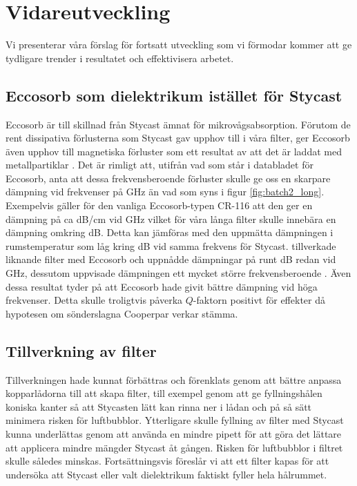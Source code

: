 \documentclass[main.tex]{subfiles}
\begin{document}

\section{Vidareutveckling}
Vi presenterar våra förslag för fortsatt utveckling som vi förmodar kommer att ge tydligare trender i resultatet och effektivisera arbetet.

\subsection{Eccosorb som dielektrikum istället för Stycast}
Eccosorb är till skillnad från Stycast ämnat för mikrovågsabsorption. Förutom de rent dissipativa förlusterna som Stycast gav upphov till i våra filter, ger Eccosorb även upphov till magnetiska förluster som ett resultat av att det är laddat med metallpartiklar \cite{Eccosorb}. Det är rimligt att, utifrån vad som står i databladet för Eccosorb, anta att dessa frekvensberoende förluster skulle ge oss en skarpare dämpning vid frekvenser på \unit[8-50]{GHz} än vad som syns i figur \ref{fig:batch2_long}. Exempelvis gäller för den vanliga Eccosorb-typen CR-116 att den ger en dämpning på ca \unit[57]{dB/cm} vid \unit[18]{GHz} \cite{Eccosorb} vilket för våra långa filter skulle innebära en dämpning omkring \unit[150]{dB}. Detta kan jämföras med den uppmätta dämpningen i rumstemperatur som låg kring \unit[10]{dB} vid samma frekvens för Stycast. \citeauthor{santavicca2008} tillverkade liknande filter med Eccosorb och uppnådde dämpningar på runt \unit[80]{dB} redan vid \unit[10]{GHz}, dessutom uppvisade dämpningen ett mycket större frekvensberoende \cite{santavicca2008}. Även dessa resultat tyder på att Eccosorb hade givit bättre dämpning vid höga frekvenser. Detta skulle troligtvis påverka $Q$-faktorn positivt för effekter då hypotesen om sönderslagna Cooperpar verkar stämma.



\subsection{Tillverkning av filter}
Tillverkningen hade kunnat förbättras och förenklats genom att bättre anpassa kopparlådorna till att skapa filter, till exempel genom att ge fyllningshålen koniska kanter så att Stycasten lätt kan rinna ner i lådan och på så sätt minimera risken för luftbubblor. Ytterligare skulle fyllning av filter med Stycast kunna underlättas genom att använda en mindre pipett för att göra det lättare att applicera mindre mängder Stycast åt gången. Risken för luftbubblor i filtret skulle således minskas. Fortsättningsvis föreslår vi att ett filter kapas för att undersöka att Stycast eller valt dielektrikum faktiskt fyller hela hålrummet.
\end{document}

